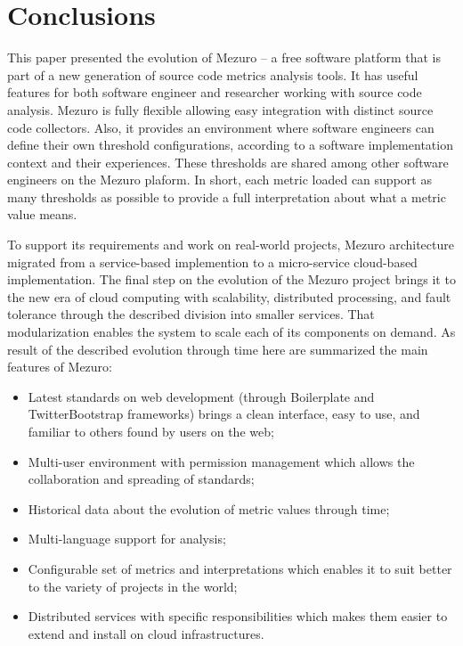\section{Conclusions}
\label{sec:conclusions}

This paper presented the evolution of Mezuro -- a free software platform that
is part of a new generation of source code metrics analysis tools.  It has
useful features for both software engineer and researcher working with source
code analysis. Mezuro is fully flexible allowing easy integration with distinct
source code collectors. Also, it provides an environment where software
engineers can define their own threshold configurations, according to a software
implementation context and their experiences. These thresholds are shared among
other software engineers on the Mezuro plaform.  In short, each metric loaded
can support as many thresholds as possible to provide a full interpretation
about what a metric value means.

To support its requirements and work on real-world projects, Mezuro architecture
migrated from a service-based implemention to a micro-service cloud-based
implementation. The final step on the evolution of the Mezuro project brings
it to the new era of cloud computing with scalability, distributed processing,
and fault tolerance through the described division into smaller services. That
modularization enables the system to scale each of its components on demand.
As result of the described evolution through time here are summarized the main
features of Mezuro:

\begin{itemize}

  \item Latest standards on web development (through Boilerplate and
        TwitterBootstrap frameworks) brings a clean interface, easy to use, and familiar
        to others found by users on the web;

  \item Multi-user environment with permission management which allows the
        collaboration and spreading of standards;

  \item Historical data about the evolution of metric values through time;

  \item Multi-language support for analysis;

  \item Configurable set of metrics and interpretations which enables it to
        suit better to the variety of projects in the world;

  \item Distributed services with specific responsibilities which makes them
        easier to extend and install on cloud infrastructures.

\end{itemize}

